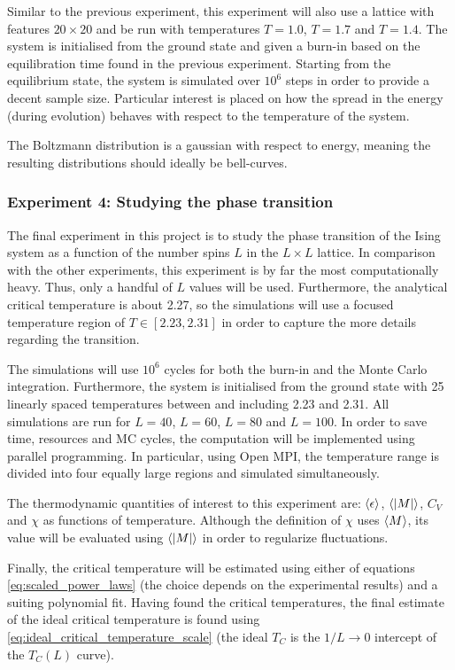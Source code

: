 \documentclass[nofootinbib,reprint,english]{revtex4-1}
\begin{document}
Similar to the previous experiment, this experiment will also use a lattice with features \(20\times20\) and be run with temperatures \(T=1.0\), \(T=1.7\) and \(T=1.4\). The system is initialised from the ground state and given a burn-in based on the equilibration time found in the previous experiment. Starting from the equilibrium state, the system is simulated over \(10^6\) steps in order to provide a decent sample size. Particular interest is placed on how the spread in the energy (during evolution) behaves with respect to the temperature of the system.

The Boltzmann distribution is a gaussian with respect to energy, meaning the resulting distributions should ideally be bell-curves.
\subsubsection{Experiment 4: Studying the phase transition}
The final experiment in this project is to study the phase transition of the Ising system as a function of the number spins \(L\) in the \(L\times L\) lattice. In comparison with the other experiments, this experiment is by far the most computationally heavy. Thus, only a handful of \(L\) values will be used. Furthermore, the analytical critical temperature is about 2.27, so the simulations will use a focused temperature region of \(T\in[2.23,2.31]\) in order to capture the more details regarding the transition.

The simulations will use \(10^6\) cycles for both the burn-in and the Monte Carlo integration. Furthermore, the system is initialised from the ground state with 25 linearly spaced temperatures between and including 2.23 and 2.31. All simulations are run for \(L=40\), \(L=60\), \(L=80\) and \(L=100\). In order to save time, resources and MC cycles, the computation will be implemented using parallel programming. In particular, using Open MPI, the temperature range is divided into four equally large regions and simulated simultaneously.

The thermodynamic quantities of interest to this experiment are: \(\expval{\epsilon}\), \(\expval{|M|}\), \(C_V\) and \(\chi\) as functions of temperature. Although the definition of \(\chi\) uses \(\expval{M}\), its value will be evaluated using \(\expval{|M|}\) in order to regularize fluctuations. 

Finally, the critical temperature will be estimated using either of equations \eqref{eq:scaled_power_laws} (the choice depends on the experimental results) and a suiting polynomial fit. Having found the critical temperatures, the final estimate of the ideal critical temperature is found using \eqref{eq:ideal_critical_temperature_scale} (the ideal \(T_C\) is the \(1/L\to0\) intercept of the \(T_C(L)\) curve).
\end{document}
